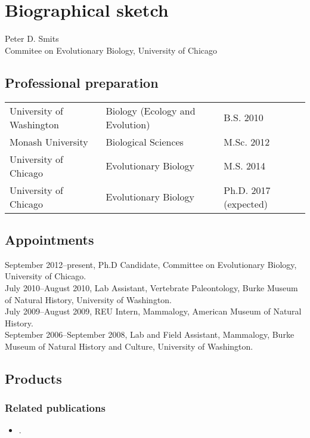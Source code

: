 \section{Biographical sketch}

Peter D. Smits\\Commitee on Evolutionary Biology, University of Chicago

\subsection{Professional preparation}
\begin{tabular}[H]{l l l}
University of Washington & Biology (Ecology and Evolution) & B.S. 2010\\
Monash University & Biological Sciences & M.Sc. 2012\\
University of Chicago & Evolutionary Biology & M.S. 2014\\
University of Chicago & Evolutionary Biology & Ph.D. 2017 (expected)
\end{tabular}

\subsection{Appointments}
September 2012--present, Ph.D Candidate, Committee on Evolutionary Biology, University of Chicago.\\
July 2010--August 2010, Lab Assistant, Vertebrate Paleontology, Burke Museum of Natural History, University of Washington.\\
July 2009--August 2009, REU Intern, Mammalogy, American Museum of Natural History.\\
September 2006--September 2008, Lab and Field Assistant, Mammalogy, Burke Museum of Natural History and Culture, University of Washington.

\subsection{Products}
\subsubsection{Related publications}
\begin{itemize}
  \item {}.  %
\end{itemize}

